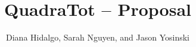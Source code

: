 \documentclass[11pt]{article}
\title{QuadraTot -- Proposal}
\author{Diana Hidalgo, Sarah Nguyen,  and Jason Yosinski \\
\code{\{djh283,smn64,jy495\}@cornell.edu}}
\begin{document}
\maketitle

\begin{abstract}

\end{abstract}




\end{document}
